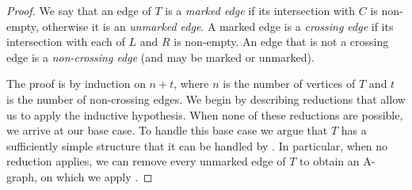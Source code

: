 \documentclass{patmorin}
\newcommand{\Fary}{Fáry}
\begin{document}
\begin{proof}
%
   We say that an edge of $T$ is a \emph{marked
   edge} if its intersection with $C$ is non-empty, otherwise it is
   an \emph{unmarked edge}.  A marked edge is a \emph{crossing edge}
   if its intersection with each of $L$ and $R$ is non-empty.  An edge
   that is not a crossing edge is a \emph{non-crossing edge} (and may
   be marked or unmarked). 


%

   The proof is by induction on $n+t$, where $n$ is the number of
   vertices of $T$ and $t$ is the number of non-crossing edges.
   We begin by describing reductions that allow us to apply the
   inductive hypothesis. When none of these reductions are possible,
   we arrive at our base case. To handle this base case we argue that
   $T$ has a sufficiently simple structure that it can be handled by
   .  In particular, when no reduction applies, we can
   remove every unmarked edge of $T$ to obtain an A-graph, on which we
   apply .


\end{proof}
\end{document}
